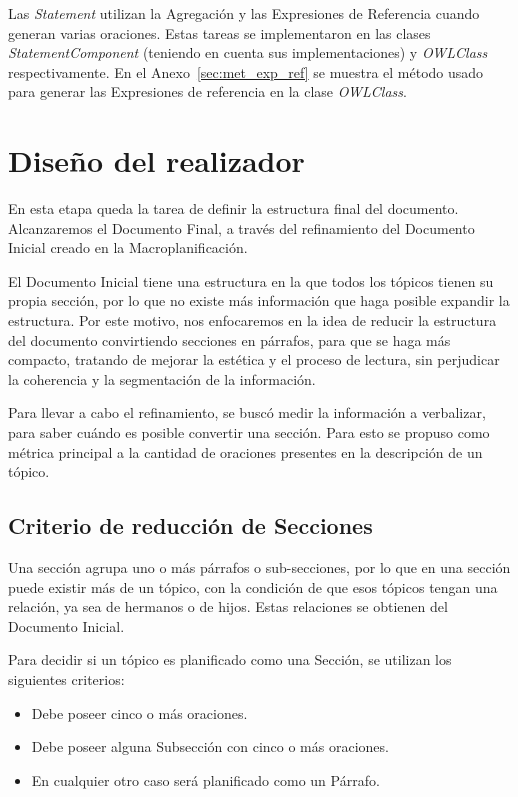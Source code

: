 Las \emph{Statement} utilizan la Agregación y las Expresiones de Referencia cuando generan varias oraciones. Estas tareas se implementaron en las clases \emph{StatementComponent} (teniendo en cuenta sus implementaciones) y \emph{OWLClass} respectivamente. En el Anexo~\ref{sec:met_exp_ref} se muestra el método usado para generar las Expresiones de referencia en la clase \emph{OWLClass}.


\section{Diseño del realizador}
En esta etapa queda la tarea de definir la estructura final del documento. 
Alcanzaremos el Documento Final, a través del refinamiento del Documento Inicial creado en la Macroplanificación.

El Documento Inicial tiene una estructura en la que todos los tópicos tienen su propia sección, por lo que no existe más información que haga posible expandir la estructura. Por este motivo, nos enfocaremos en la idea de reducir la estructura del documento convirtiendo secciones en párrafos, para que se haga más compacto, tratando de mejorar la estética y el proceso de lectura, sin perjudicar la coherencia y la segmentación de la información.

Para llevar a cabo el refinamiento, se buscó medir la información a verbalizar, para saber cuándo es posible convertir una sección. Para esto se propuso como métrica principal a la cantidad de oraciones presentes en la descripción de un tópico.

\subsection{Criterio de reducción de Secciones}
Una sección agrupa uno o más párrafos o sub-secciones, por lo que en una sección puede existir más de un tópico, con la condición de que esos tópicos tengan una relación, ya sea de hermanos o de hijos. Estas relaciones se obtienen del Documento Inicial. 

Para decidir si un tópico es planificado como una Sección, se utilizan los siguientes criterios:
\begin{itemize}
    \item Debe poseer cinco o más oraciones.
    \item Debe poseer alguna Subsección con cinco o más oraciones.
    \item En cualquier otro caso será planificado como un Párrafo.
\end{itemize}



